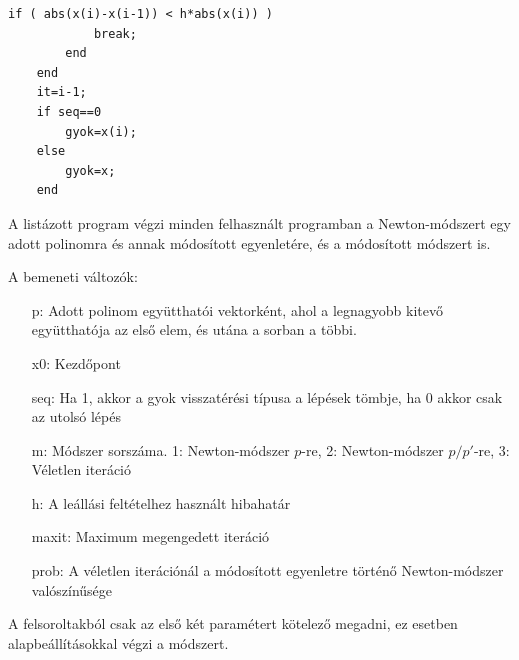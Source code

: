 \documentclass[a4paper,12pt]{report}
\begin{document}
\begin{appendices}
\begin{singlespace}
\begin{lstlisting}[caption=Newton.m]
        if ( abs(x(i)-x(i-1)) < h*abs(x(i)) )                       
            break;                                                  
        end                                                         
    end                                                             
    it=i-1;                                                         
    if seq==0                                                       
        gyok=x(i);                                                  
    else                                                            
        gyok=x;                                                     
    end                                                             
			\end{lstlisting}
            \end{singlespace}
			A listázott program végzi minden felhasznált programban a Newton-módszert egy adott polinomra és annak módosított egyenletére, és a módosított módszert is.
			        
            A bemeneti változók:
			\begin{enumerate}
				\item[p:] Adott polinom együtthatói vektorként, ahol a legnagyobb kitevő együtthatója az első elem, és utána a sorban a többi.
				\item[x0:] Kezdőpont
				\item[seq:] Ha 1, akkor a gyok visszatérési típusa a lépések tömbje, ha 0 akkor csak az utolsó lépés
				\item[m:] Módszer sorszáma. 1: Newton-módszer $p$-re, 2: Newton-módszer $p/p'$-re, 3: Véletlen iteráció
				\item[h:] A leállási feltételhez használt hibahatár
				\item[maxit:] Maximum megengedett iteráció
				\item[prob:] A véletlen iterációnál a módosított egyenletre történő Newton-módszer valószínűsége
			\end{enumerate}
			A felsoroltakból csak az első két paramétert kötelező megadni, ez esetben alapbeállításokkal végzi a módszert.













    

\end{appendices}
\end{document}

